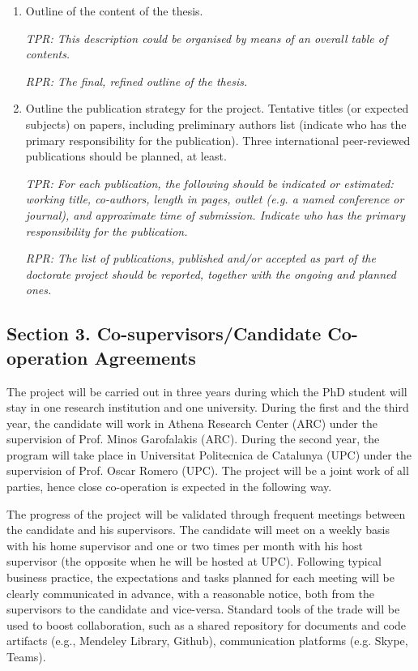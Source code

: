 \documentclass[12pt]{article}
\begin{document}
\begin{enumerate}
\item Outline of the content of the thesis.

\begin{shaded}
\emph{TPR: This description could be organised by means of an overall table of contents.}

\emph{RPR: The final, refined outline of the thesis.}
\end{shaded}

\item
Outline the publication strategy for the project.
Tentative titles (or expected subjects) on papers, including preliminary authors list (indicate who has the primary responsibility for the publication). Three international peer-reviewed publications should be planned, at least.

\begin{shaded}
\emph{TPR:
For each publication, the following should be indicated or estimated: working title, co-authors, length in pages, outlet (e.g. a named conference or journal), and approximate time of submission. Indicate who has the primary responsibility for the publication. 
}

\emph{RPR: The list of publications, published and/or accepted as part of the doctorate project should be reported, together with the ongoing and planned ones.}
\end{shaded}

\end{enumerate}

\subsection*{Section 3. Co-supervisors/Candidate Co-operation Agreements}
The project will be carried out in three years during which the PhD student will stay in one research institution and one university. During the first and the third year, the candidate will work in Athena Research Center (ARC) under the supervision of Prof. Minos Garofalakis (ARC). During the second year, the program
will take place in Universitat Politecnica de Catalunya (UPC) under the supervision of Prof. Oscar Romero (UPC). The project will be a joint work of all parties, hence close co-operation is expected in the following way.

The progress of the project will be validated through frequent meetings between the candidate and his supervisors. The candidate will meet on a weekly basis with his home supervisor and one or two times per month with his host supervisor (the opposite when he will be hosted at UPC). Following typical business practice, the expectations and tasks planned for each meeting will be clearly communicated in advance, with a reasonable notice, both from the supervisors to the candidate and vice-versa. Standard tools of the trade will be used to boost collaboration, such
as a shared repository for documents and code artifacts (e.g., Mendeley Library, Github), communication platforms (e.g. Skype, Teams).
\end{document}
